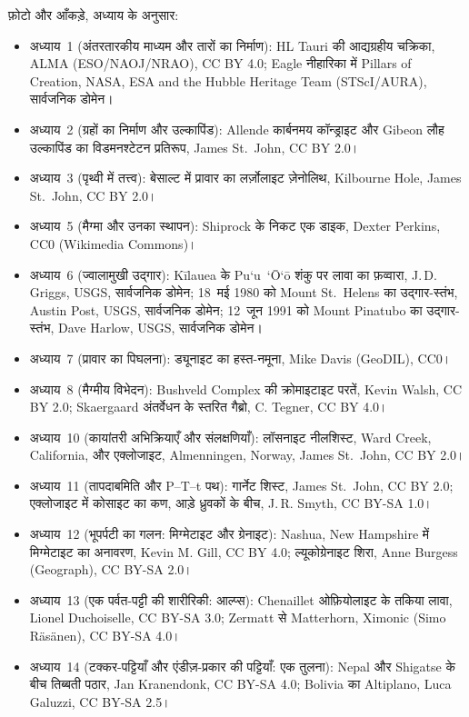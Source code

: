 \bigskip
\noindent फ़ोटो और आँकड़े, अध्याय के अनुसार:
\begin{itemize}\small\setlength{\emergencystretch}{2em}
  \item अध्याय~1 (अंतरतारकीय माध्यम और तारों का निर्माण): HL Tauri की आद्यग्रहीय चक्रिका, ALMA (ESO/NAOJ/NRAO), CC BY 4.0; Eagle नीहारिका में Pillars of Creation, NASA, ESA and the Hubble Heritage Team (STScI/AURA), सार्वजनिक डोमेन।
  \item अध्याय~2 (ग्रहों का निर्माण और उल्कापिंड): Allende कार्बनमय कॉन्ड्राइट और Gibeon लौह उल्कापिंड का विडमनश्टेटन प्रतिरूप, James St.~John, CC BY 2.0।
  \item अध्याय~3 (पृथ्वी में तत्त्व): बेसाल्ट में प्रावार का लर्ज़ोलाइट ज़ेनोलिथ, Kilbourne Hole, James St.~John, CC BY 2.0।
  \item अध्याय~5 (मैग्मा और उनका स्थापन): Shiprock के निकट एक डाइक, Dexter Perkins, CC0 (Wikimedia Commons)।
  \item अध्याय~6 (ज्वालामुखी उद्गार): Kīlauea के Pu`u~`\=O`\=o शंकु पर लावा का फ़व्वारा, J.\,D. Griggs, USGS, सार्वजनिक डोमेन; 18~मई 1980 को Mount St.~Helens का उद्गार-स्तंभ, Austin Post, USGS, सार्वजनिक डोमेन; 12~जून 1991 को Mount Pinatubo का उद्गार-स्तंभ, Dave Harlow, USGS, सार्वजनिक डोमेन।
  \item अध्याय~7 (प्रावार का पिघलना): ड्यूनाइट का हस्त-नमूना, Mike Davis (GeoDIL), CC0।
  \item अध्याय~8 (मैग्मीय विभेदन): Bushveld Complex की क्रोमाइटाइट परतें, Kevin Walsh, CC BY 2.0; Skaergaard अंतर्वेधन के स्तरित गैब्रो, C. Tegner, CC BY 4.0।
  \item अध्याय~10 (कायांतरी अभिक्रियाएँ और संलक्षणियाँ): लॉसनाइट नीलशिस्ट, Ward Creek, California, और एक्लोजाइट, Almenningen, Norway, James St.~John, CC BY 2.0।
  \item अध्याय~11 (तापदाबमिति और P--T--t पथ): गार्नेट शिस्ट, James St.~John, CC BY 2.0; एक्लोजाइट में कोसाइट का कण, आड़े ध्रुवकों के बीच, J.\,R. Smyth, CC BY-SA 1.0।
  \item अध्याय~12 (भूपर्पटी का गलन: मिग्मेटाइट और ग्रेनाइट): Nashua, New Hampshire में मिग्मेटाइट का अनावरण, Kevin M. Gill, CC BY 4.0; ल्यूकोग्रेनाइट शिरा, Anne Burgess (Geograph), CC BY-SA 2.0।
  \item अध्याय~13 (एक पर्वत-पट्टी की शारीरिकी: आल्प्स): Chenaillet ओफ़ियोलाइट के तकिया लावा, Lionel Duchoiselle, CC BY-SA 3.0; Zermatt से Matterhorn, Ximonic (Simo Räsänen), CC BY-SA 4.0।
  \item अध्याय~14 (टक्कर-पट्टियाँ और एंडीज़-प्रकार की पट्टियाँ: एक तुलना): Nepal और Shigatse के बीच तिब्बती पठार, Jan Kranendonk, CC BY-SA 4.0; Bolivia का Altiplano, Luca Galuzzi, CC BY-SA 2.5।

\end{itemize}
